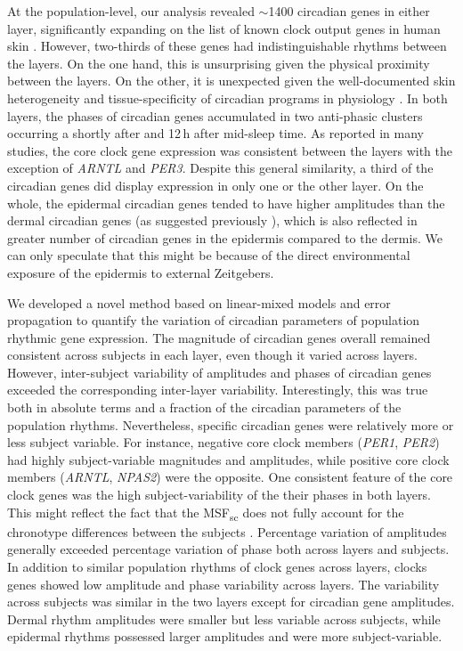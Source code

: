 At the population-level, our analysis revealed $\sim$1400 circadian genes in either layer, significantly expanding on the list of known clock output genes in human skin \cite{Wu2018, Wu2020}. However, two-thirds of these genes had indistinguishable rhythms between the layers. On the one hand, this is unsurprising given the physical proximity between the layers. On the other, it is unexpected given the well-documented skin heterogeneity and tissue-specificity of circadian programs in physiology \cite{Ruben2018}. In both layers, the phases of circadian genes accumulated in two anti-phasic clusters occurring a shortly after and 12\,h after mid-sleep time. As reported in many studies, the core clock gene expression was consistent between the layers with the exception of \textit{ARNTL} and \textit{PER3}. Despite this general similarity, a third of the circadian genes did display expression in only one or the other layer. On the whole, the epidermal circadian genes tended to have higher amplitudes than the dermal circadian genes (as suggested previously \cite{Wu2020}), which is also reflected in greater number of circadian genes in the epidermis compared to the dermis. We can only speculate that this might be because of the direct environmental exposure of the epidermis to external Zeitgebers.

We developed a novel method based on linear-mixed models and error propagation to quantify the variation of circadian parameters of population rhythmic gene expression. The magnitude of circadian genes overall remained consistent across subjects in each layer, even though it varied across layers. However, inter-subject variability of amplitudes and phases of circadian genes exceeded the corresponding inter-layer variability. Interestingly, this was true both in absolute terms and a fraction of the circadian parameters of the population rhythms. Nevertheless, specific circadian genes were relatively more or less subject variable. For instance, negative core clock members (\textit{PER1}, \textit{PER2}) had highly subject-variable magnitudes and amplitudes, while positive core clock members (\textit{ARNTL}, \textit{NPAS2}) were the opposite. One consistent feature of the core clock genes was the high subject-variability of the their phases in both layers. This might reflect the fact that the MSF\textsubscript{sc} does not fully account for the chronotype differences between the subjects . Percentage variation of amplitudes generally exceeded percentage variation of phase both across layers and subjects. In addition to similar population rhythms of clock genes across layers, clocks genes showed low amplitude and phase variability across layers. The variability across subjects was similar in the two layers except for circadian gene amplitudes. Dermal rhythm amplitudes were smaller but less variable across subjects, while epidermal rhythms possessed larger amplitudes and were more subject-variable.


